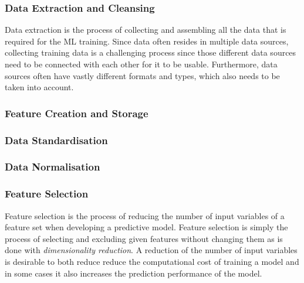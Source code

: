     \subsubsection{Data Extraction and Cleansing}
    \label{sec:data-extraction-cleansing-preprocessing-architecture}

      Data extraction is the process of collecting and assembling all the data that is required for the ML training.
      Since data often resides in multiple data sources, collecting training data is a challenging process since those different data sources need to be connected with each other for it to be usable. Furthermore, data sources often have vastly different formats and types, which also needs to be taken into account.

    \subsubsection{Feature Creation and Storage}
    \label{sec:feature-creation-storage-preprocessing-architecture}

    \subsubsection{Data Standardisation}
    \label{sec:data-standardisation-data-preprocessing-architecture}
    \subsubsection{Data Normalisation}
    \label{sec:data-normalisation-data-preprocessing-architecture}

    \subsubsection{Feature Selection}
    \label{sec:feature-selection-data-preprocessing-architecture}

      Feature selection is the process of reducing the number of input variables of a feature set when developing a predictive model.
      Feature selection is simply the process of selecting and excluding given features without changing them as is done with \emph{dimensionality reduction}.
      A reduction of the number of input variables is desirable to both reduce reduce the computational cost of training a model and in some cases it also increases the prediction performance of the model.


